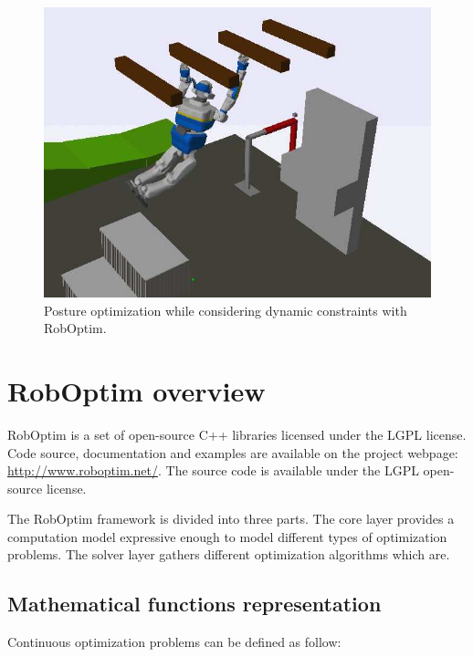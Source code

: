 \documentclass[conference,final,a4paper,twocolumn,9pt]{IEEEtran}
\begin{document}
\begin{figure}[ht!]
  \begin{center}
    \includegraphics[width=\linewidth]{agent-067.jpg}
    \caption{Posture optimization while considering dynamic
      constraints with RobOptim.\label{fig:stence-optimization}}
  \end{center}
\end{figure}



\section{RobOptim overview}\label{sec:roboptim}


RobOptim is a set of open-source C++ libraries licensed under the LGPL
license. Code source, documentation and examples are available on the
project webpage: \mbox{\url{http://www.roboptim.net/}}. The source
code is available under the LGPL open-source license.


The RobOptim framework is divided into three parts. The core layer
provides a computation model expressive enough to model different
types of optimization problems. The solver layer gathers different
optimization algorithms which are.


\subsection{Mathematical functions representation}


Continuous optimization problems can be defined as follow:
\end{document}
